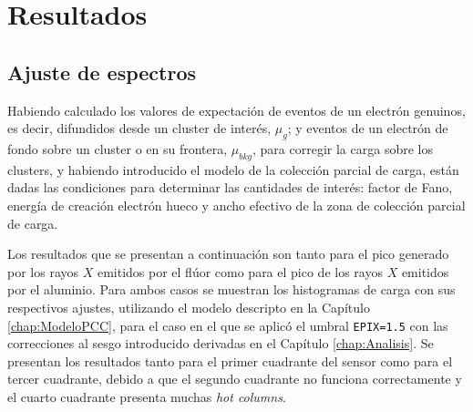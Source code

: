 \chapter{Resultados \label{chap:Resultados}}
\section{Ajuste de espectros}
\noindent Habiendo calculado los valores de expectación de eventos de un electrón genuinos, es decir, difundidos desde un cluster de interés, $\mu_{g}$; y eventos de un electrón de fondo sobre un cluster o en su frontera, $\mu_{bkg}$, para corregir la carga sobre los clusters, y habiendo introducido el modelo de la colección parcial de carga, están dadas las condiciones para determinar las cantidades de interés: factor de Fano, energía de creación electrón hueco y ancho efectivo de la zona de colección parcial de carga.

Los resultados que se presentan a continuación son tanto para el pico generado por los rayos $X$ emitidos por el flúor como para el pico de los rayos $X$ emitidos por el aluminio. Para ambos casos se muestran los histogramas de carga con sus respectivos ajustes, utilizando el modelo descripto en la Capítulo \ref{chap:ModeloPCC}, para el caso en el que se aplicó el umbral \verb|EPIX=1.5| con las correcciones al sesgo introducido derivadas en el Capítulo \ref{chap:Analisis}. 
Se presentan los resultados tanto para el primer cuadrante del sensor como para el tercer cuadrante, debido a que el segundo cuadrante no funciona correctamente y el cuarto cuadrante presenta muchas \textit{hot columns}.

